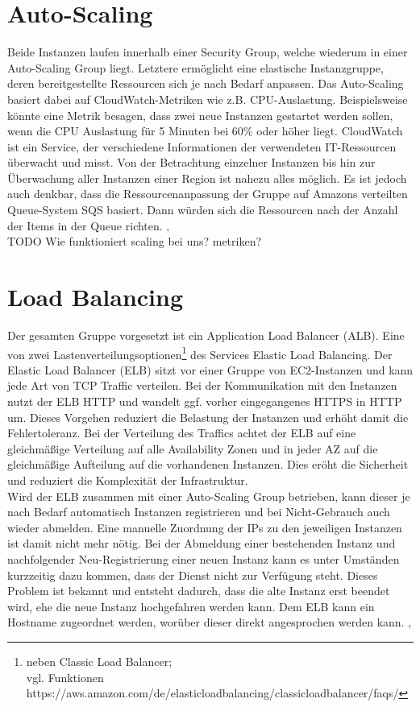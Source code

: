 \section{Auto-Scaling}
\label{sec:auto-scaling}
Beide Instanzen laufen innerhalb einer Security Group, welche wiederum in einer Auto-Scaling Group liegt. Letztere ermöglicht eine elastische Instanzgruppe, deren bereitgestellte Ressourcen sich je nach Bedarf anpassen. Das Auto-Scaling basiert dabei auf CloudWatch-Metriken wie z.B. CPU-Auslastung. Beispielsweise könnte eine Metrik besagen, dass zwei neue Instanzen gestartet werden sollen, wenn die CPU Auslastung für 5 Minuten bei 60\% oder höher liegt. CloudWatch ist ein Service, der verschiedene Informationen der verwendeten IT-Ressourcen überwacht und misst. Von der Betrachtung einzelner Instanzen bis hin zur Überwachung aller Instanzen einer Region ist nahezu alles möglich. Es ist jedoch auch denkbar, dass die Ressourcenanpassung der Gruppe auf Amazons verteilten Queue-System SQS basiert. Dann würden sich die Ressourcen nach der Anzahl der Items in der Queue richten. \cite{vliet:resilience}, \cite{vliet:programmingec2} \\

TODO Wie funktioniert scaling bei uns? metriken?

\section{Load Balancing}
\label{sec:elb}
Der gesamten Gruppe vorgesetzt ist ein Application Load Balancer (ALB). Eine von zwei Lastenverteilungsoptionen\footnote{neben Classic Load Balancer; \\vgl. Funktionen https://aws.amazon.com/de/elasticloadbalancing/classicloadbalancer/faqs/} des Services Elastic Load Balancing.
Der Elastic Load Balancer (ELB) sitzt vor einer Gruppe von EC2-Instanzen und kann jede Art von TCP Traffic verteilen. Bei der Kommunikation mit den Instanzen nutzt der ELB HTTP und wandelt ggf. vorher eingegangenes HTTPS in HTTP um. Dieses Vorgehen reduziert die Belastung der Instanzen und erhöht damit die Fehlertoleranz. Bei der Verteilung des Traffics achtet der ELB auf eine gleichmäßige Verteilung auf alle Availability Zonen und in jeder AZ auf die gleichmäßige Aufteilung auf die vorhandenen Instanzen. Dies eröht die Sicherheit und reduziert die Komplexität der Infrastruktur.
\\ Wird der ELB zusammen mit einer Auto-Scaling Group betrieben, kann dieser je nach Bedarf automatisch Instanzen registrieren und bei Nicht-Gebrauch auch wieder abmelden. Eine manuelle Zuordnung der IPs zu den jeweiligen Instanzen ist damit nicht mehr nötig. Bei der Abmeldung einer bestehenden Instanz und nachfolgender Neu-Registrierung einer neuen Instanz kann es unter Umständen kurzzeitig dazu kommen, dass der Dienst nicht zur Verfügung steht. Dieses Problem ist bekannt und entsteht dadurch, dass die alte Instanz erst beendet wird, ehe die neue Instanz hochgefahren werden kann.
Dem ELB kann ein Hostname zugeordnet werden, worüber dieser direkt angesprochen werden kann.
\cite{vliet:resilience}, \cite{aws:elb} \\

